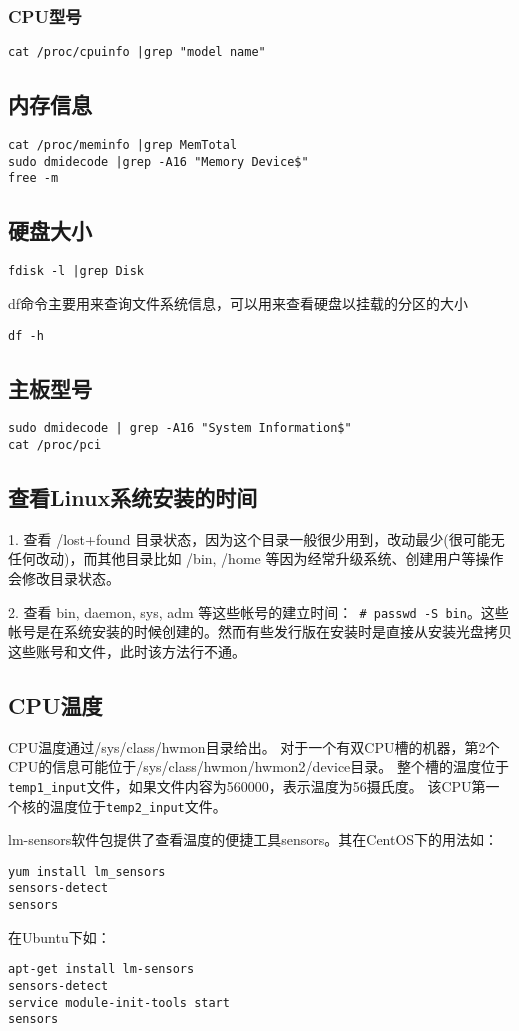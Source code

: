 \subsubsection*{CPU型号}
\begin{verbatim}
cat /proc/cpuinfo |grep "model name"
\end{verbatim}

\subsection*{内存信息}
\begin{verbatim}
cat /proc/meminfo |grep MemTotal
sudo dmidecode |grep -A16 "Memory Device$"
free -m
\end{verbatim}

\subsection*{硬盘大小}
\begin{verbatim}
fdisk -l |grep Disk
\end{verbatim}
df命令主要用来查询文件系统信息，可以用来查看硬盘以挂载的分区的大小
\begin{verbatim}
df -h
\end{verbatim}

\subsection{主板型号}
\begin{verbatim}
sudo dmidecode | grep -A16 "System Information$"
cat /proc/pci
\end{verbatim}

\subsection{查看Linux系统安装的时间}

1. 查看 /lost+found 目录状态，因为这个目录一般很少用到，改动最少(很可能无任何改动)，而其他目录比如 /bin, /home 等因为经常升级系统、创建用户等操作会修改目录状态。

2. 查看 bin, daemon, sys, adm 等这些帐号的建立时间：\verb$ # passwd -S bin$。这些帐号是在系统安装的时候创建的。然而有些发行版在安装时是直接从安装光盘拷贝这些账号和文件，此时该方法行不通。



\subsection{CPU温度}
CPU温度通过/sys/class/hwmon目录给出。
对于一个有双CPU槽的机器，第2个CPU的信息可能位于/sys/class/hwmon/hwmon2/device目录。
整个槽的温度位于\verb|temp1_input|文件，如果文件内容为560000，表示温度为56摄氏度。
该CPU第一个核的温度位于\verb|temp2_input|文件。

lm-sensors软件包提供了查看温度的便捷工具sensors。其在CentOS下的用法如：
\begin{verbatim}
yum install lm_sensors
sensors-detect
sensors
\end{verbatim}
在Ubuntu下如：
\begin{verbatim}
apt-get install lm-sensors
sensors-detect
service module-init-tools start
sensors
\end{verbatim}










